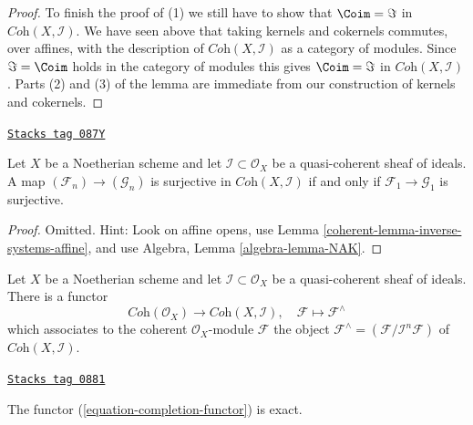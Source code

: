 \begin{proof}
\medskip\noindent
To finish the proof of (1) we still have to show that $\Coim = \Im$
in $\textit{Coh}(X, \mathcal{I})$. We have seen above that taking
kernels and cokernels commutes, over affines, with the description
of $\textit{Coh}(X, \mathcal{I})$ as a category of modules. Since
$\Im = \Coim$ holds in the category of modules
this gives $\Coim = \Im$ in $\textit{Coh}(X, \mathcal{I})$.
Parts (2) and (3) of the lemma are immediate from our construction
of kernels and cokernels.
\end{proof}

\begin{lemma}
\label{coherent-lemma-inverse-systems-surjective}
\href{https://stacks.math.columbia.edu/tag/087Y}{\texttt{Stacks tag 087Y}}

Let $X$ be a Noetherian scheme and let $\mathcal{I} \subset \mathcal{O}_X$
be a quasi-coherent sheaf of ideals. A map
$(\mathcal{F}_n) \to (\mathcal{G}_n)$ is surjective in
$\textit{Coh}(X, \mathcal{I})$
if and only if $\mathcal{F}_1 \to \mathcal{G}_1$ is surjective.
\end{lemma}

\begin{proof}

Omitted. Hint: Look on affine opens, use
Lemma \ref{coherent-lemma-inverse-systems-affine}, and use
Algebra, Lemma \ref{algebra-lemma-NAK}.
\end{proof}

Let $X$ be a Noetherian scheme and let $\mathcal{I} \subset \mathcal{O}_X$
be a quasi-coherent sheaf of ideals. There is a functor
\begin{equation}
\label{equation-completion-functor}
\textit{Coh}(\mathcal{O}_X) \longrightarrow \textit{Coh}(X, \mathcal{I}), \quad
\mathcal{F} \longmapsto \mathcal{F}^\wedge
\end{equation}
which associates to the coherent $\mathcal{O}_X$-module $\mathcal{F}$
the object $\mathcal{F}^\wedge = (\mathcal{F}/\mathcal{I}^n\mathcal{F})$
of $\textit{Coh}(X, \mathcal{I})$.

\begin{lemma}[Exact]
\label{coherent-lemma-exact}
\href{https://stacks.math.columbia.edu/tag/0881}{\texttt{Stacks tag 0881}}

The functor (\ref{equation-completion-functor}) is exact.
\end{lemma}


